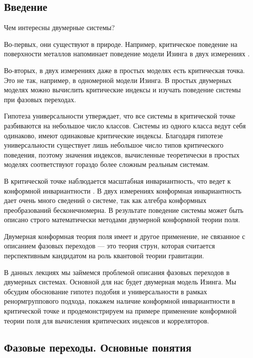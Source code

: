 \documentclass[a4paper,12pt]{article}
\theoremstyle{definition}
\theoremstyle{definition}
\theoremstyle{definition}
\begin{document}
\subsection{Введение}
\label{sec:intro}
Чем интересны двумерные системы?

Во-первых, они существуют в природе. Например, критическое поведение на поверхности металлов
напоминает поведение модели Изинга в двух измерениях \cite{campuzano1985110}.

Во-вторых, в двух измерениях даже в простых моделях есть критическая точка. Это не так, например, в
одномерной модели Изинга. В простых двумерных моделях можно вычислить критические индексы и изучать
поведение системы при фазовых переходах.

Гипотеза универсальности утверждает, что все системы в критической точке разбиваются на небольшое
число классов. Системы из одного класса ведут себя одинаково, имеют одинаковые критические индексы.
Благодаря гипотезе универсальности существует лишь небольшое число типов критического поведения,
поэтому значения индексов, вычисленные теоретически в простых моделях соответствуют гораздо более
сложным реальным системам.

В критической точке наблюдается масштабная инвариантность, что ведет к конформной инвариантности
\cite{Polyakov:1970xd}. В двух измерениях конформная инвариантность дает очень много сведений о
системе, так как алгебра конформных преобразований бесконечномерна. В результате поведение системы
может быть описано строго математически методами двумерной конформной теории поля.

Двумерная конформная теория поля имеет и другое применение, не связанное с описанием фазовых
переходов --- это теория струн, которая считается перспективным кандидатом на роль квантовой теории
гравитации.

В данных лекциях мы займемся проблемой описания фазовых переходов в двумерных системах. Основной для
нас будет двумерная модель Изинга. Мы обсудим обоснование гипотез подобия и универсальности в рамках
ренормгруппового подхода, покажем наличие конформной инвариантности в критической точке и
продемонстрируем на примере применение конформной теории поля для вычисления критических индексов и
корреляторов.

\subsection{Фазовые переходы. Основные понятия}
\label{sec:phase-transitions}
\end{document}

